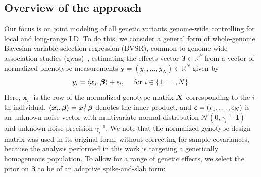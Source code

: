 \subsection{Overview of the approach}
Our focus is on joint modeling of all genetic variants genome-wide controlling for local and long-range LD. To do this, we consider a general form of whole-genome Bayesian variable selection regression (BVSR), common to genome-wide association studies (\gls{gwas})~\cite{sbayesr, Orliac2022}, estimating the effects vector $\bm{\beta}\in \mathbb{R}^P$ from a vector of normalized phenotype measurements $\bm{y}=(y_1, \ldots, y_N) \in \mathbb{R}^N$ given by
\begin{equation}
    \label{lin_model}
    y_i = \langle {\boldsymbol x}_i, \bm{\beta}  \rangle + \epsilon_i, \quad  \text{ for } i\in \{1, \ldots, N\}.  
\end{equation}
Here, $\bm{x}_i^\top$ is the row of the normalized genotype matrix ${\boldsymbol X}$ corresponding to the $i$-th individual, $\langle {\boldsymbol x}_i, \bm{\beta}  \rangle = {\boldsymbol x}_i^\top \bm{\beta}$ denotes the inner product, and ${\boldsymbol \epsilon} = (\epsilon_1, \ldots, \epsilon_N)$ is an unknown noise vector with multivariate normal distribution $\mathcal N(0, \gamma_{\epsilon}^{-1} \cdot \bm{I})$ and unknown noise precision $\gamma_{\epsilon}^{-1}$. We note that the normalized genotype design matrix was used in its original form, without correcting for sample covariances, because the analysis performed in this work is targeting a genetically homogeneous population. To allow for a range of genetic effects, we select the prior on $\bm{\beta}$ to be of an adaptive spike-and-slab form: 

